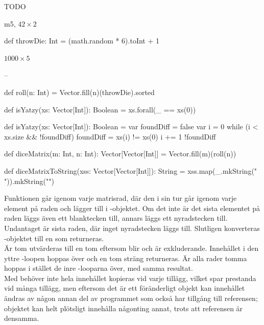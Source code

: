\Subtask TODO

\Subtask m5, $42 \times 2$

\Task

\Subtask \begin{Code}
def throwDie: Int = (math.random * 6).toInt + 1
\end{Code}

\Subtask $1000 \times 5$

\Subtask -- %

\Subtask \begin{Code}
def roll(n: Int) = Vector.fill(n)(throwDie).sorted
\end{Code}

\Subtask \begin{Code}
def isYatzy(xs: Vector[Int]): Boolean = xs.forall(_ == xs(0))
\end{Code}

\Subtask \begin{Code}
def isYatzy(xs: Vector[Int]): Boolean = {
	var foundDiff = false
	var i = 0
	while (i < xs.size && !foundDiff) {
		foundDiff = xs(i) != xs(0)
		i += 1
	}
	!foundDiff
}
\end{Code}

\Subtask \begin{Code}
def diceMatrix(m: Int, n: Int): Vector[Vector[Int]] =
  Vector.fill(m)(roll(n))
\end{Code}

\Subtask \begin{Code}
def diceMatrixToString(xss: Vector[Vector[Int]]): String =
  xss.map(_.mkString(" ")).mkString("\n")
\end{Code}

\Subtask Funktionen går igenom varje matrisrad, där den i sin tur går igenom
varje element på raden och lägger till i -objektet. Om det inte är
det sista elementet på raden läggs även ett blanktecken till, annars läggs ett
nyradstecken till. Undantaget är sista raden, där inget nyradstecken läggs till.
Slutligen konverteras -objektet till en  som
returneras.\\
Är  tom utvärderas  till en tom 
eftersom  blir  och  är exkluderande.
Innehållet i den yttre -loopen hoppas över och en tom sträng returneras.
Är alla rader tomma hoppas i stället de inre -looparna över, med samma resultat.\\
Med  behöver inte hela innehållet kopieras vid varje tillägg,
vilket spar prestanda vid många tillägg,
men eftersom det är ett föränderligt objekt kan innehållet ändras av någon annan
del av programmet som också har tillgång till referensen; objektet kan helt plötsligt
 innehålla någonting annat, trots att referensen är densamma.

